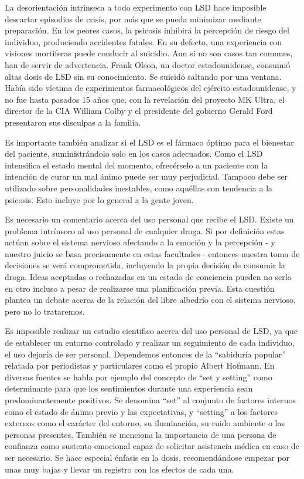 La desorientación intrínseca a todo experimento con LSD hace imposible descartar episodios de crisis, por más que se pueda minimizar mediante preparación. En los peores casos, la psicosis inhibirá la percepción de riesgo del individuo, produciendo accidentes fatales. En su defecto, una experiencia con visiones mortiferas puede conducir al suicidio. Aun si no son casos tan comunes, han de servir de advertencia. Frank Olson, un doctor estadounidense, consumió altas dosis de LSD sin su conocimiento. Se suicidó saltando por una ventana. Había sido víctima de experimentos farmacológicos del ejército estadounidense, y no fue hasta pasados 15 años que, con la revelación del proyecto MK Ultra, el director de la CIA William Colby y el presidente del gobierno Gerald Ford presentaron sus disculpas a la familia.

Es importante también analizar si el LSD es el fármaco óptimo para el bienestar del paciente, suministrándolo solo en los casos adecuados. Como el LSD intensifica el estado mental del momento, ofrecérselo a un paciente con la intención de curar un mal ánimo puede ser muy perjudicial. Tampoco debe ser utilizado sobre personalidades inestables, como aquéllas con tendencia a la psicosis. Esto incluye por lo general a la gente joven.

Es necesario un comentario acerca del uso personal que recibe el LSD. Existe un problema intrínseco al uso personal de cualquier droga. Si por definición estas actúan sobre el sistema nervioso afectando a la emoción y la percepción - y nuestro juicio se basa precisamente en estas facultades - entonces nuestra toma de decisiones se verá comprometida, incluyendo la propia decisión de consumir la droga. Ideas aceptadas o rechazadas en un estado de conciencia pueden no serlo en otro incluso a pesar de realizarse una planificación previa. Esta cuestión plantea un debate acerca de la relación del libre albedrío con el sistema nervioso, pero no lo trataremos.

Es imposible realizar un estudio cientifico acerca del uso personal de LSD, ya que de establecer un entorno controlado y realizar un seguimiento de cada individuo, el uso dejaría de ser personal. Dependemos entonces de la \enquote{sabiduría popular} relatada por periodistas y particulares como el propio Albert Hofmann. En diversas fuentes se habla por ejemplo del concepto de \enquote{set y setting} como determinante para que los sentimientos durante una experiencia sean predominantemente positivos. Se denomina \enquote{set} al conjunto de factores internos como el estado de ánimo previo y las expectativas, y \enquote{setting} a los factores externos como el carácter del entorno, su iluminación, su ruido ambiente o las personas presentes. También se menciona la importancia de una persona de confianza como sustento emocional capaz de solicitar asistencia médica en caso de ser necesario. Se hace especial énfasis en la dosis, recomendándose empezar por unas muy bajas y llevar un registro con los efectos de cada una.

